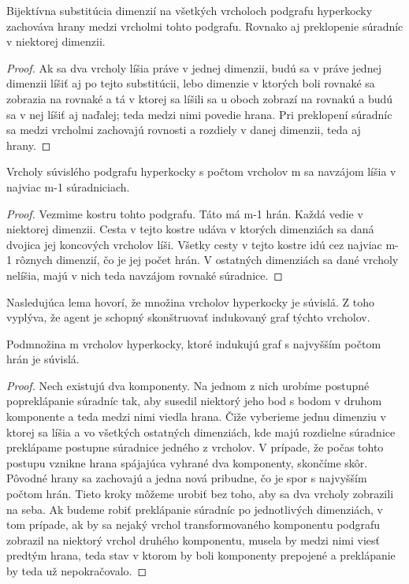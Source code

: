 \begin{lem}
Bijektívna substitúcia dimenzií na všetkých vrcholoch podgrafu hyperkocky 
zachováva
hrany medzi vrcholmi tohto podgrafu. Rovnako aj preklopenie súradníc 
v niektorej dimenzii.
\end{lem}
\begin{proof}
Ak sa dva vrcholy líšia práve v jednej dimenzii, budú sa v práve jednej
dimenzii líšiť aj po tejto substitúcii, lebo dimenzie v ktorých boli rovnaké
sa zobrazia na rovnaké a tá v ktorej sa líšili sa u oboch zobrazí na rovnakú
a budú sa v nej líšiť aj naďalej; teda medzi nimi povedie hrana.
Pri preklopení súradníc sa medzi vrcholmi zachovajú rovnosti a rozdiely v
danej dimenzii, teda aj hrany.
\end{proof}

\begin{lem}
Vrcholy súvislého podgrafu hyperkocky s počtom vrcholov m sa navzájom líšia
v najviac m-1 súradniciach.
\end{lem}

\begin{proof}
Vezmime kostru tohto podgrafu. Táto má m-1 hrán. Každá vedie v niektorej
dimenzii. Cesta v tejto kostre udáva v ktorých dimenziách sa daná dvojica
jej koncových vrcholov líši. Všetky cesty v tejto kostre idú cez najviac m-1
rôznych dimenzií, čo je jej počet hrán. V ostatných dimenziách sa dané
vrcholy nelíšia, majú v nich teda navzájom rovnaké súradnice.
\end{proof}

Nasledujúca lema hovorí, že množina vrcholov hyperkocky je súvislá. Z toho
vyplýva, že agent je schopný skonštruovať indukovaný graf týchto vrcholov.

\begin{lem}
Podmnožina m vrcholov hyperkocky, ktoré indukujú graf s najvyšším počtom hrán je
súvislá.
\end{lem}

\begin{proof}
Nech existujú dva komponenty. Na jednom z nich urobíme 
postupné popreklápanie súradníc tak, aby susedil niektorý jeho bod s bodom
v druhom komponente a teda medzi nimi viedla hrana. Čiže vyberieme jednu
dimenziu v ktorej sa líšia a vo všetkých ostatných dimenziách, kde majú
rozdielne súradnice preklápame postupne súradnice jedného z vrcholov. 
V prípade, že počas tohto postupu vznikne hrana spájajúca vyhrané dva
komponenty, skončíme skôr. Pôvodné hrany sa
zachovajú a jedna nová pribudne, čo je spor s najvyšším počtom hrán.
Tieto kroky môžeme urobiť bez toho, aby sa dva vrcholy zobrazili na seba.
Ak budeme robiť preklápanie súradníc po jednotlivých dimenziách,
v tom prípade, ak by sa nejaký vrchol transformovaného komponentu
podgrafu zobrazil na niektorý vrchol druhého komponentu, musela by 
medzi nimi viesť predtým hrana, teda stav v ktorom by boli komponenty
prepojené a preklápanie by teda už nepokračovalo.
\end{proof}


